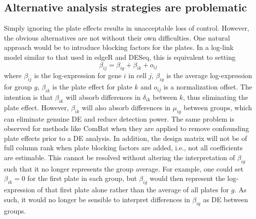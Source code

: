 \documentclass{article}
\begin{document}
\subsection{Alternative analysis strategies are problematic}
Simply ignoring the plate effects results in unacceptable loss of control.
However, the obvious alternatives are not without their own difficulties.
One natural approach would be to introduce blocking factors for the plates.
In a log-link model similar to that used in edgeR and DESeq, this is equivalent to setting
\[
    \beta_{ij} = \beta_{ig} + \beta_{ik} + o_{ij}
\]
where $\beta_{ij}$ is the log-expression for gene $i$ in cell $j$, $\beta_{ig}$ is the average log-expression for group $g$, 
    $\beta_{ik}$ is the plate effect for plate $k$ and $o_{ij}$ is a normalization offset.
The intention is that $\beta_{ik}$ will absorb differences in $\delta_{ik}$ between $k$, thus eliminating the plate effect.
However, $\beta_{ik}$ will also absorb differences in $\mu_{ig}$ between groups, which can eliminate genuine DE and reduce detection power.
The same problem is observed for methods like ComBat \cite{johnson2007adjusting} when they are applied to remove confounding plate effects prior to a DE analysis.
In addition, the design matrix will not be of full column rank when plate blocking factors are added, i.e., not all coefficients are estimable.
This cannot be resolved without altering the interpretation of $\beta_{ig}$ such that it no longer represents the group average.
For example, one could set $\beta_{ik}=0$ for the first plate in each group, 
    but $\beta_{ig}$ would then represent the log-expression of that first plate alone rather than the average of all plates for $g$.
As such, it would no longer be sensible to interpret differences in $\beta_{ig}$ as DE between groups.
\end{document}

